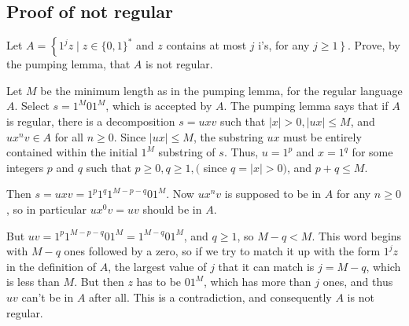 \documentclass[a4paper]{exam}
\begin{document}
\subsection{Proof of not regular} Let \(A=\left\{1^{j} z \mid z \in\{0,1\}^{*}\right.\) and \(z\) contains at most \(j\) i's, for any \(\left.j \geq 1\right\} .\) Prove, by the
pumping lemma, that \(A\) is not regular.\\
\begin{solution}
    Let $M$ be the minimum length as in the pumping lemma, for the regular language $A$. Select $s=1^{M} 01^{M}$, which is accepted by $A$. The pumping lemma says that if $A$ is regular, there is a decomposition $s=u x v$ such that $|x|>0,|u x| \leq M$, and $u x^{n} v \in A$ for all $n \geq 0$. Since $|u x| \leq M$, the substring $u x$ must be entirely contained within the initial $1^{M}$ substring of $s$. Thus, $u=1^{p}$ and $x=1^{q}$ for some integers $p$ and $q$ such that $p \geq 0, q \geq 1,($ since $q=|x|>0)$, and $p+q \leq M$.

    Then $s=u x v=1^{p} 1^{q} 1^{M-p-q} 01^{M} .$ Now $u x^{n} v$ is supposed to be in $A$ for any $n \geq 0$, so in particular $u x^{0} v=u v$ should be in $A$.

    But $u v=1^{p} 1^{M-p-q} 01^{M}=1^{M-q} 01^{M}$, and $q \geq 1$, so $M-q<M$. This word begins with $M-q$ ones followed by a zero, so if we try to match it up with the form $1^{j} z$ in the definition of $A$, the largest value of $j$ that it can match is $j=M-q$, which is less
    than $M$. But then $z$ has to be $01^{M}$, which has more than $j$ ones, and thus $u v$ can't be in $A$ after all. This is a contradiction, and consequently $A$ is not regular.
\end{solution}
\end{document}
